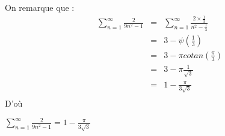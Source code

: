 On remarque que :
\[
  \begin{array}{rrcl}
     & \sum\limits_{n=1}^{\infty}\frac{2}{9n^2-1} & = & \sum\limits_{n=1}^{\infty}\frac{2\times\frac{1}{3}}{n^2-\frac{1}{3}} \\
     &                                            & = & 3 - \psi\left(\frac{1}{3}\right)                                     \\
     &                                            & = & 3 - \pi cotan\left(\frac{\pi}{3}\right)                              \\
     &                                            & = & 3 - \pi \frac{1}{\sqrt{3}}                                           \\
     &                                            & = & 1 - \frac{\pi}{3\sqrt{3}}                                            \\
  \end{array}
\]
D'où
\begin{result}
  $\sum\limits_{n=1}^{\infty}\frac{2}{9n^2-1} = 1 - \frac{\pi}{3\sqrt{3}}$
\end{result}
